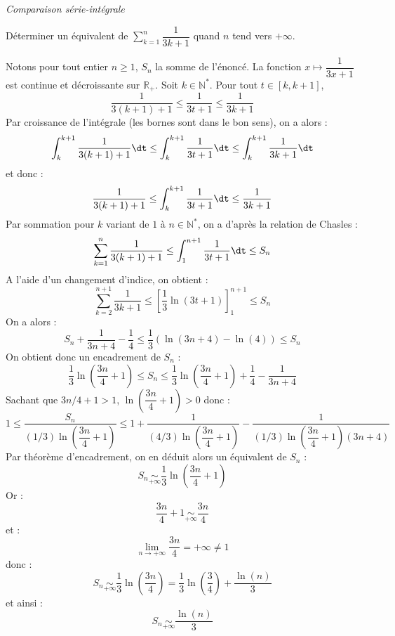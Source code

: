 \documentclass[a4paper,10pt]{report}
\newcommand{\Sum}[2]{\ensuremath{\textstyle{\sum\limits_{#1}^{#2}}}}
\begin{document}
\medskip

\begin{center}
\textit{{ {\large Comparaison série-intégrale}}}
\end{center}

\medskip

\begin{Exercice}{} Déterminer un équivalent de $\Sum{k=1}n \dfrac{1}{3k+1}$ quand $n$ tend vers $+ \infty$.
\end{Exercice}

\corr Notons pour tout entier $n \geq 1$, $S_n$ la somme de l'énoncé. La fonction $x \mapsto \dfrac{1}{3x+1}$ est continue et décroissante sur $\mathbb{R}_+$. Soit $k \in \mathbb{N}^*$. Pour tout $t \in [k,k+1]$,
$$ \dfrac{1}{3(k+1)+1} \leq \dfrac{1}{3t+1} \leq \dfrac{1}{3k+1}$$
Par croissance de l'intégrale (les bornes sont dans le bon sens), on a alors :
$$ \int_{k}^{k+1} \dfrac{1}{3(k+1)+1} \dt \leq  \int_{k}^{k+1} \dfrac{1}{3t+1} \dt \leq  \int_{k}^{k+1} \dfrac{1}{3k+1} \dt$$
et donc :
$$  \dfrac{1}{3(k+1)+1}  \leq  \int_{k}^{k+1} \dfrac{1}{3t+1} \dt  \leq  \dfrac{1}{3k+1} $$
Par sommation pour $k$ variant de $1$ à $n \in \mathbb{N}^*$, on a d'après la relation de Chasles :
$$ \sum_{k=1}^n \dfrac{1}{3(k+1)+1}  \leq  \int_{1}^{n+1} \dfrac{1}{3t+1} \dt  \leq S_n $$
A l'aide d'un changement d'indice, on obtient :
$$ \sum_{k=2}^{n+1} \dfrac{1}{3k+1}  \leq  \left[ \dfrac{1}{3} \ln(3t+1) \right]_1^{n+1}  \leq S_n $$
On a alors :
$$ S_n + \dfrac{1}{3n+4} - \dfrac{1}{4} \leq \dfrac{1}{3} ( \ln(3n+4)- \ln(4)) \leq S_n $$
On obtient donc un encadrement de $S_n$ :
$$ \dfrac{1}{3} \ln \left( \dfrac{3n}{4} + 1 \right) \leq S_n \leq \dfrac{1}{3} \ln \left( \dfrac{3n}{4} + 1 \right) + \dfrac{1}{4} - \dfrac{1}{3n+4}$$
Sachant que $3n/4+1>1$, $\ln \left( \dfrac{3n}{4} + 1 \right)>0$ donc :
$$ 1 \leq \dfrac{S_n}{(1/3)\ln \left( \dfrac{3n}{4} + 1 \right)} \leq 1 + \dfrac{1}{(4/3)\ln \left( \dfrac{3n}{4} + 1 \right)} - \dfrac{1}{(1/3)\ln \left( \dfrac{3n}{4} + 1 \right)(3n+4)}$$
Par théorème d'encadrement, on en déduit alors un équivalent de $S_n$ :
$$ S_n \underset{+ \infty}{\sim}\dfrac{1}{3} \ln \left( \dfrac{3n}{4} + 1 \right)$$
Or :
$$  \dfrac{3n}{4} + 1 \underset{+ \infty}{\sim}  \dfrac{3n}{4}$$
et :
$$ \lim_{n \rightarrow + \infty}  \dfrac{3n}{4} = + \infty \neq 1$$
donc :
$$ S_n \underset{+ \infty}{\sim} \dfrac{1}{3} \ln \left( \dfrac{3n}{4} \right) =  \dfrac{1}{3} \ln \left( \dfrac{3}{4} \right) + \dfrac{\ln(n)}{3}$$
et ainsi :
$$ S_n \underset{+ \infty}{\sim}\dfrac{\ln(n)}{3}$$

\medskip
\end{document}
